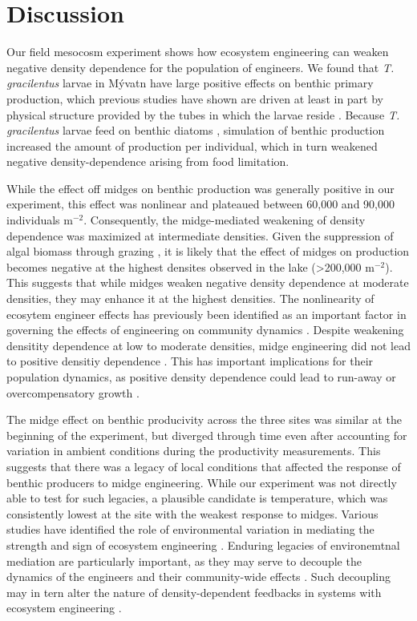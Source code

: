 
\section*{Discussion}

Our field mesocosm experiment shows how ecosystem engineering can weaken negative 
density dependence for the population of engineers.
We found that \emph{T. gracilentus} larvae in  M\'{y}vatn have large positive 
effects on benthic primary production,
which previous studies have shown are driven at least in part by physical 
structure provided by the tubes in which the larvae reside 
\citep{hoelker2015, phillips2019}.
Because \emph{T. gracilentus} larvae feed on benthic diatoms \citep{ingvason2004},
simulation of benthic production increased the amount of production per individual,
which in turn weakened negative density-dependence arising from food limitation.


While the effect off midges on benthic production was generally positive in our experiment,
this effect was nonlinear and plateaued between 60,000 and 90,000 
individuals $\text{m}^{-2}$.
Consequently, 
the midge-mediated weakening of density dependence was maximized
at intermediate densities.
Given the suppression of algal biomass through grazing \citep{einarsson2016},
it is likely that the effect of midges on production becomes negative
at the highest densites observed in the lake (>200,000 $\text{m}^{-2}$).
This suggests that while midges weaken negative density dependence at moderate
densities, they may enhance it at the highest densities.
The nonlinearity of ecosytem engineer effects has previously been identified 
as an important factor in governing the effects of engineering on community dynamics 
\citep{bozec2013}.
Despite weakening densitity dependence at low to moderate densities,
midge engineering did not lead to positive densitiy dependence 
\citep[i.e., allee effects;][]{courchamp1999}.
This has important implications for their population dynamics,
as positive density dependence could lead to run-away or overcompensatory growth
\citep{turchin2003, cuddington2009}.

The midge effect on benthic producivity across the three sites 
was similar at the beginning of the experiment,
but diverged through time even after accounting for variation in ambient conditions
during the productivity measurements.
This suggests that there was a legacy of local conditions that affected the 
response of benthic producers to midge engineering.
While our experiment was not directly able to test for such legacies,
a plausible candidate is temperature,
which was consistently lowest at the site with the weakest response to midges.
Various studies have identified the role of environmental variation in mediating 
the strength and sign of ecosystem engineering \citep{wright2006,lathlean2017}.
Enduring legacies of environemtnal mediation are particularly important,
as they may serve to decouple the dynamics of the engineers 
and their community-wide effects
\citep{cuddington2011}.
Such decoupling may in tern alter the nature of density-dependent feedbacks in 
systems with ecosystem engineering \citep{cuddington2009}.